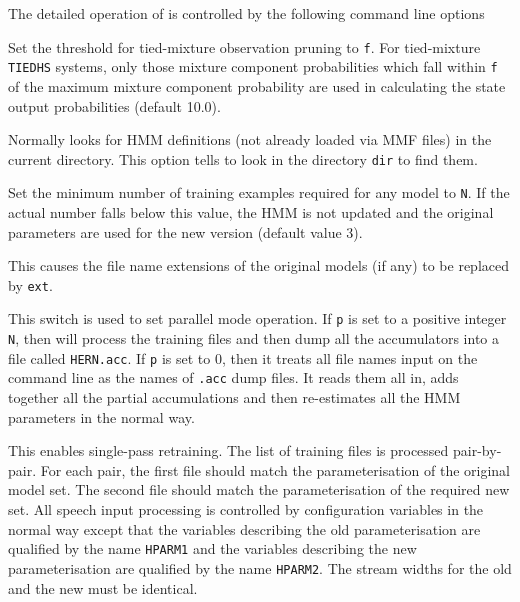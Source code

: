 The detailed operation of  is controlled by the following
command line options
\begin{optlist}

   Set the threshold for tied-mixture observation
      pruning to {\tt f}.
      For tied-mixture \texttt{TIEDHS} systems, only those 
      mixture component probabilities which fall within {\tt f} of
      the maximum mixture component probability are used in calculating
      the state output probabilities (default 10.0).
 
      Normally  looks for HMM definitions
       (not already loaded via MMF files) 
      in the current directory.  This option tells  to look in
      the directory {\tt dir} to find them.


    Set the minimum number of training examples 
    required for any model to {\tt N}.  If the actual number
    falls below this value, the HMM is not updated and the original
    parameters are used for the new version (default value 3).

    This causes the file name extensions of the
      original models (if any) to be replaced by {\tt ext}.

    This switch is used to set parallel mode operation.
      If {\tt p} is set to a positive integer {\tt N}, then  will
      process the training files and then dump all the accumulators
      into a file called {\tt HERN.acc}.  If {\tt p} is set to 0, then
      it treats all file names input on the command line as the names
      of {\tt .acc} dump files.  It reads them all in, adds together
      all the partial accumulations and then re-estimates all the
      HMM parameters in the normal way. 

    This enables single-pass retraining.  The list of training
      files is processed pair-by-pair.  For each pair, the first file
      should match the parameterisation of the original model set.  The
      second file should match the parameterisation of the required new
      set.  All speech input processing is controlled by configuration
      variables in the normal way except that the variables describing
      the old parameterisation are qualified by the name \texttt{HPARM1}
      and the variables describing the new parameterisation are
      qualified by the name \texttt{HPARM2}.  The stream widths for the
      old and the new must be identical.


\end{optlist}

